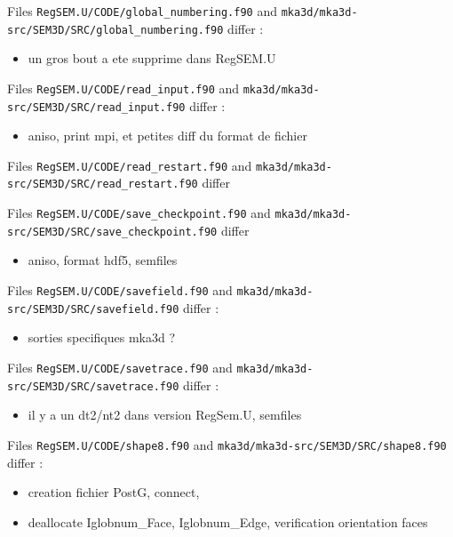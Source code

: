 \documentclass[10pt,a4paper,english]{article}
\begin{document}
Files \texttt{RegSEM.U/CODE/global{\_}numbering.f90} and \texttt{mka3d/mka3d-src/SEM3D/SRC/global{\_}numbering.f90} differ :
\begin{itemize}
\item {} 
un gros bout a ete supprime dans RegSEM.U

\end{itemize}

Files \texttt{RegSEM.U/CODE/read{\_}input.f90} and \texttt{mka3d/mka3d-src/SEM3D/SRC/read{\_}input.f90} differ :
\begin{itemize}
\item {} 
aniso, print mpi, et petites diff du format de fichier

\end{itemize}

Files \texttt{RegSEM.U/CODE/read{\_}restart.f90} and \texttt{mka3d/mka3d-src/SEM3D/SRC/read{\_}restart.f90} differ

Files \texttt{RegSEM.U/CODE/save{\_}checkpoint.f90} and \texttt{mka3d/mka3d-src/SEM3D/SRC/save{\_}checkpoint.f90} differ
\begin{itemize}
\item {} 
aniso, format hdf5, semfiles

\end{itemize}

Files \texttt{RegSEM.U/CODE/savefield.f90} and \texttt{mka3d/mka3d-src/SEM3D/SRC/savefield.f90} differ :
\begin{itemize}
\item {} 
sorties specifiques mka3d ?

\end{itemize}

Files \texttt{RegSEM.U/CODE/savetrace.f90} and \texttt{mka3d/mka3d-src/SEM3D/SRC/savetrace.f90} differ :
\begin{itemize}
\item {} 
il y a un dt2/nt2 dans version RegSem.U, semfiles

\end{itemize}

Files \texttt{RegSEM.U/CODE/shape8.f90} and \texttt{mka3d/mka3d-src/SEM3D/SRC/shape8.f90} differ :
\begin{itemize}
\item {} 
creation fichier PostG, connect,

\item {} 
deallocate Iglobnum{\_}Face, Iglobnum{\_}Edge, verification orientation faces

\end{itemize}
\end{document}
